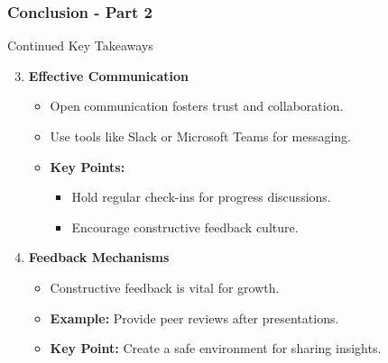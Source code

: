 \documentclass[aspectratio=169]{beamer}
\begin{document}
\begin{frame}[fragile]
    \frametitle{Conclusion - Part 2}
    \begin{block}{Continued Key Takeaways}
        \begin{enumerate}
            \setcounter{enumi}{2} %
            \item \textbf{Effective Communication}
            \begin{itemize}
                \item Open communication fosters trust and collaboration.
                \item Use tools like Slack or Microsoft Teams for messaging.
                \item \textbf{Key Points:}
                \begin{itemize}
                    \item Hold regular check-ins for progress discussions.
                    \item Encourage constructive feedback culture.
                \end{itemize}
            \end{itemize}

            \item \textbf{Feedback Mechanisms}
            \begin{itemize}
                \item Constructive feedback is vital for growth.
                \item \textbf{Example:} Provide peer reviews after presentations.
                \item \textbf{Key Point:} Create a safe environment for sharing insights.
            \end{itemize}
        \end{enumerate}
    \end{block}
\end{frame}
\end{document}
